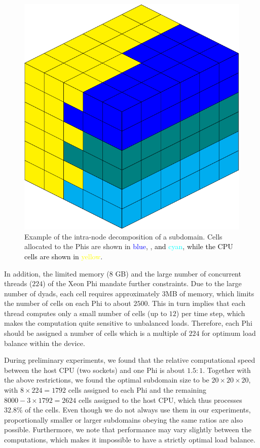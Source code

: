  \begin{figure}[bth]
\center
\includegraphics[scale=0.5]{figs/cube}
\caption{Example of the intra-node decomposition of a subdomain. Cells allocated to the Phis are shown in \textcolor{blue}{blue}, \color{teal}{teal}, \textcolor{black}{and} \textcolor{cyan}{cyan}, \textcolor{black}{while the CPU cells are shown in} \textcolor{yellow}{yellow}.}
\label{nodeload}
\end{figure}

In addition, the limited memory ($8$ GB) and the large number of concurrent threads ($224$) of the Xeon Phi mandate further constraints. Due to the large number of dyads, each cell 
requires approximately $3$MB of memory, which limits the number of cells on each Phi to about $2500$. This in turn implies that each thread computes only a small number of cells (up to $12$) per time step, which makes the computation quite sensitive to unbalanced loads. Therefore, each Phi should be assigned a number of cells which is a multiple of $224$ for 
optimum load balance within the device. 


During preliminary experiments, we found that the relative computational speed between the host CPU (two sockets) and one Phi is about $1.5 : 1$. Together with the above restrictions, we found the optimal subdomain size to be $20\times20\times20$, with $8\times224=1792$ cells assigned to each Phi and the remaining $8000-3\times1792=2624$ cells assigned to the host CPU, which thus processes $32.8\%$ of the cells. Even though we do not always use them in our experiments, proportionally smaller or larger subdomains obeying the same ratios are also possible. Furthermore, we note that performance may vary slightly between the computations, which makes it impossible to have a strictly optimal load balance. 
 
